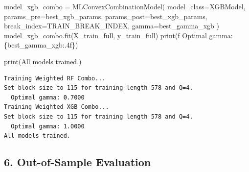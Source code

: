 \documentclass[
  letterpaper,
  DIV=11,
  numbers=noendperiod]{scrartcl}
\newenvironment{Shaded}{\begin{snugshade}}{\end{snugshade}}
\newcommand{\BuiltInTok}[1]{\textcolor[rgb]{0.00,0.23,0.31}{#1}}
\newcommand{\NormalTok}[1]{\textcolor[rgb]{0.00,0.23,0.31}{#1}}
\newcommand{\OperatorTok}[1]{\textcolor[rgb]{0.37,0.37,0.37}{#1}}
\newcommand{\SpecialCharTok}[1]{\textcolor[rgb]{0.37,0.37,0.37}{#1}}
\newcommand{\SpecialStringTok}[1]{\textcolor[rgb]{0.13,0.47,0.30}{#1}}
\newcommand{\StringTok}[1]{\textcolor[rgb]{0.13,0.47,0.30}{#1}}
\begin{document}
\begin{Shaded}
\begin{Highlighting}[]
\NormalTok{model\_xgb\_combo }\OperatorTok{=}\NormalTok{ MLConvexCombinationModel(}
\NormalTok{    model\_class}\OperatorTok{=}\NormalTok{XGBModel, params\_pre}\OperatorTok{=}\NormalTok{best\_xgb\_params, params\_post}\OperatorTok{=}\NormalTok{best\_xgb\_params,}
\NormalTok{    break\_index}\OperatorTok{=}\NormalTok{TRAIN\_BREAK\_INDEX, gamma}\OperatorTok{=}\NormalTok{best\_gamma\_xgb}
\NormalTok{)}
\NormalTok{model\_xgb\_combo.fit(X\_train\_full, y\_train\_full)}
\BuiltInTok{print}\NormalTok{(}\SpecialStringTok{f\textquotesingle{}  Optimal gamma: }\SpecialCharTok{\{}\NormalTok{best\_gamma\_xgb}\SpecialCharTok{:.4f\}}\SpecialStringTok{\textquotesingle{}}\NormalTok{)}

\BuiltInTok{print}\NormalTok{(}\StringTok{\textquotesingle{}All models trained.\textquotesingle{}}\NormalTok{)}
\end{Highlighting}
\end{Shaded}

\begin{verbatim}
Training Weighted RF Combo...
Set block size to 115 for training length 578 and Q=4.
  Optimal gamma: 0.7000
Training Weighted XGB Combo...
Set block size to 115 for training length 578 and Q=4.
  Optimal gamma: 1.0000
All models trained.
\end{verbatim}

\subsection{6. Out-of-Sample Evaluation}\label{out-of-sample-evaluation}
\end{document}
